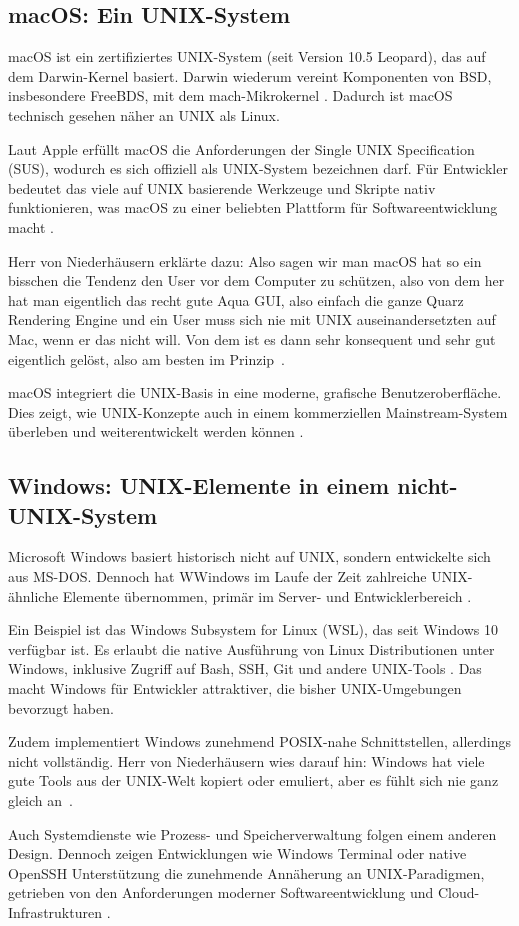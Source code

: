 \subsection{macOS: Ein UNIX-System}

macOS ist ein zertifiziertes UNIX-System (seit Version 10.5 \glqq Leopard\grqq), das auf dem Darwin-Kernel basiert. Darwin wiederum vereint Komponenten von BSD,
insbesondere FreeBDS, mit dem mach-Mikrokernel \cite{FreeBSDOS}. Dadurch ist macOS technisch gesehen näher an UNIX als Linux.

Laut Apple erfüllt macOS die Anforderungen der Single UNIX Specification (SUS), wodurch es sich offiziell als UNIX-System bezeichnen darf. Für Entwickler bedeutet
das viele auf UNIX basierende Werkzeuge und Skripte nativ funktionieren, was macOS zu einer beliebten Plattform für Softwareentwicklung macht \cite{OSConcept}.

Herr von Niederhäusern erklärte dazu: \glqq Also sagen wir man macOS hat so ein bisschen die Tendenz den User vor dem Computer zu schützen, also von dem her hat
man eigentlich das recht gute Aqua GUI, also einfach die ganze Quarz Rendering Engine und ein User muss sich nie mit UNIX auseinandersetzten auf Mac, wenn er das
nicht will. Von dem ist es dann sehr konsequent und sehr gut eigentlich gelöst, also am besten im Prinzip\grqq \ \cite{interviewNH}.

macOS integriert die UNIX-Basis in eine moderne, grafische Benutzeroberfläche. Dies zeigt, wie UNIX-Konzepte auch in einem kommerziellen Mainstream-System überleben
und weiterentwickelt werden können \cite{FreeBSDOS}.


\newpage
\subsection{Windows: UNIX-Elemente in einem nicht-UNIX-System}

Microsoft Windows basiert historisch nicht auf UNIX, sondern entwickelte sich aus MS-DOS. Dennoch hat WWindows im Laufe der Zeit zahlreiche UNIX-ähnliche Elemente
übernommen, primär im Server- und Entwicklerbereich \cite{ModernOS}.

Ein Beispiel ist das Windows Subsystem for Linux (WSL), das seit Windows 10 verfügbar ist. Es erlaubt die native Ausführung von Linux Distributionen unter Windows,
inklusive Zugriff auf Bash, SSH, Git und andere UNIX-Tools \cite{WSL}. Das macht Windows für Entwickler attraktiver, die bisher UNIX-Umgebungen bevorzugt haben.

Zudem implementiert Windows zunehmend POSIX-nahe Schnittstellen, allerdings nicht vollständig. Herr von Niederhäusern wies darauf hin: \glqq Windows hat viele gute
Tools aus der UNIX-Welt kopiert oder emuliert, aber es fühlt sich nie ganz gleich an\grqq \ \cite{interviewNH}.

Auch Systemdienste wie Prozess- und Speicherverwaltung folgen einem anderen Design. Dennoch zeigen Entwicklungen wie Windows Terminal oder native OpenSSH
Unterstützung die zunehmende Annäherung an UNIX-Paradigmen, getrieben von den Anforderungen moderner Softwareentwicklung und Cloud-Infrastrukturen
\cite{ArtOfUnixProgramming, OSConcept}.